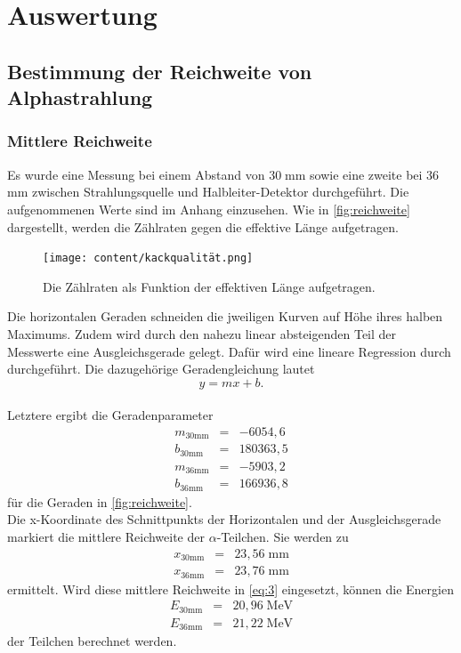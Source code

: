 \section{Auswertung}
\label{sec:Auswertung}

\subsection{Bestimmung der Reichweite von Alphastrahlung}
\subsubsection*{Mittlere Reichweite}
Es wurde eine Messung bei einem Abstand von $30 \; $mm sowie eine zweite bei $36 \; $mm zwischen 
Strahlungsquelle und Halbleiter-Detektor durchgeführt. 
Die aufgenommenen Werte sind im Anhang einzusehen.
Wie in \autoref{fig:reichweite} dargestellt, werden die Zählraten gegen die effektive Länge 
aufgetragen.\\
\begin{figure}[H]
  \centering
  \texttt{[image: content/kackqualität.png]}
  \caption{Die Zählraten als Funktion der effektiven Länge aufgetragen.}
  \label{fig:reichweite}
\end{figure}
Die horizontalen Geraden schneiden die jweiligen Kurven auf Höhe ihres halben
Maximums. Zudem wird durch den nahezu linear absteigenden Teil der Messwerte eine 
Ausgleichsgerade gelegt. Dafür wird eine lineare Regression durch \cite{numpy} durchgeführt. Die 
dazugehörige Geradengleichung lautet
\begin{equation}
  y = mx + b.
  \label{eq:linreg}
\end{equation}\\
Letztere ergibt die Geradenparameter
\begin{eqnarray}
  m_{\mathrm{30mm}} &=&  -6054,6  \nonumber  \\
  b_{\mathrm{30mm}} &=&  180363,5 \nonumber  \\
  m_{\mathrm{36mm}} &=&  -5903,2  \nonumber  \\
  b_{\mathrm{36mm}} &=&  166936,8 \nonumber
\end{eqnarray}
für die Geraden in \autoref{fig:reichweite}.\\
Die x-Koordinate des Schnittpunkts der Horizontalen und der Ausgleichsgerade markiert die 
mittlere Reichweite der $\alpha$-Teilchen. 
Sie werden zu 
\begin{eqnarray}
  x_{\mathrm{30mm}} &=& 23,56 \;  \mathrm{mm} \nonumber  \\
  x_{\mathrm{36mm}} &=& 23,76  \; \mathrm{mm} \nonumber  
\end{eqnarray}
ermittelt.
Wird diese mittlere Reichweite in \autoref{eq:3} eingesetzt, können die Energien 
\begin{eqnarray}
  E_{\mathrm{30mm}} &=& 20,96 \; \mathrm{MeV} \nonumber  \\
  E_{\mathrm{36mm}} &=& 21,22 \; \mathrm{MeV} \nonumber  
\end{eqnarray}
der Teilchen berechnet werden. 




